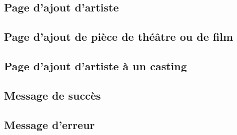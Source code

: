 \documentclass{article}
\begin{document}
\begin{center}
\end{center}

\subsection{Page d'ajout d'artiste}

\begin{center}
\end{center}

\subsection{Page d'ajout de pièce de théâtre ou de film}

\begin{center}
\end{center}


\subsection{Page d'ajout d'artiste à un casting}

\begin{center}
\end{center}

\subsection{Message de succès}

\begin{center}
\end{center}

\subsection{Message d'erreur}

\begin{center}
\end{center}





  
\end{document}
